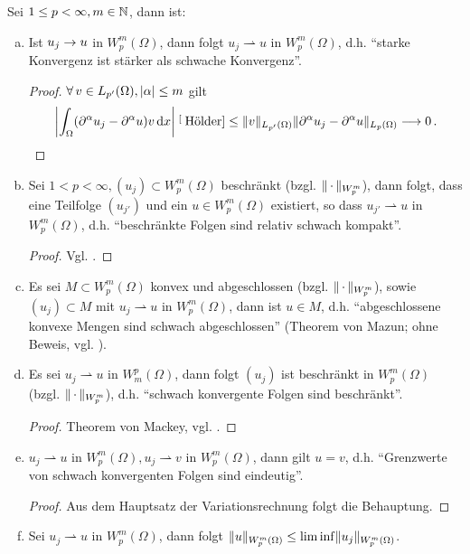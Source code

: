 \begin{bem}
\label{bem:A.13}
Sei $1\leq p < \infty, m \in \mathbb{N}$, dann ist:
\begin{enumerate}[(a)]
\item Ist $u_j \rightarrow u$ in $W^m_p(\Omega)$, dann folgt $u_j \rightharpoonup u$ in $W^m_p(\Omega)$, d.h. "`starke Konvergenz ist stärker als schwache Konvergenz"'.
\begin{proof}
$\forall \, v \in L_{p'}(\Omega), \lvert \alpha\rvert \leq m$ gilt
\[
	\left\lvert \int_\Omega (\partial^\alpha u_j - \partial^\alpha u) v \,\mathrm{d} x\right\rvert \stackrel[\scriptsize\text{Hölder}]{}\leq \lVert v\rVert_{L_{p'}(\Omega)} \lVert \partial^\alpha u_j -\partial^\alpha u \rVert_{L_p(\Omega)} \longrightarrow 0 \, .\qedhere
\]
\end{proof}
\item Sei $1 < p < \infty, (u_j)\subset W^m_p(\Omega)$ beschränkt (bzgl. $\lVert \, \cdot\, \rVert_{W^m_p}$), dann folgt, dass eine Teilfolge $(u_{j'})$ und ein $u \in W^m_p(\Omega)$ existiert, so dass $u_{j'} \rightharpoonup u$ in $W^m_p(\Omega)$, d.h. "`beschränkte Folgen sind relativ schwach kompakt"'.
\begin{proof}
Vgl. \cite{Rudin}.
\end{proof}
\item Es sei $M\subset W^m_p(\Omega)$ konvex und abgeschlossen (bzgl. $\lVert \, \cdot\, \rVert_{W^m_p}$), sowie $(u_j) \subset M$ mit $u_j \rightharpoonup u $ in $W^m_p(\Omega)$, dann ist $u \in M$, d.h. "`abgeschlossene konvexe Mengen sind schwach abgeschlossen"' (Theorem von Mazun; ohne Beweis, vgl. \cite{Rudin}).
\item Es sei $u_j \rightharpoonup u $ in $W^p_m (\Omega)$, dann folgt $(u_j)$ ist beschränkt in $W^m_p(\Omega)$ (bzgl. $\lVert \, \cdot\, \rVert_{W^m_p}$), d.h. "`schwach konvergente Folgen sind beschränkt"'.
\begin{proof}
Theorem von Mackey, vgl. \cite{Rudin}.
\end{proof}
\item $u_ j \rightharpoonup u $ in $W^m_p(\Omega), u_j \rightharpoonup v$ in $W^m_p(\Omega)$, dann gilt $u=v$, d.h. "`Grenzwerte von schwach konvergenten Folgen sind eindeutig"'.
\begin{proof}
Aus dem Hauptsatz der Variationsrechnung folgt die Behauptung.
\end{proof}
\item Sei $u_j \rightharpoonup u $ in $W^m_p(\Omega)$, dann folgt $\lVert u\rVert_{W^m_p(\Omega)} \leq \lim \inf \lVert u_j\rVert_{W^m_p(\Omega)}$.
\end{enumerate}
\end{bem}


